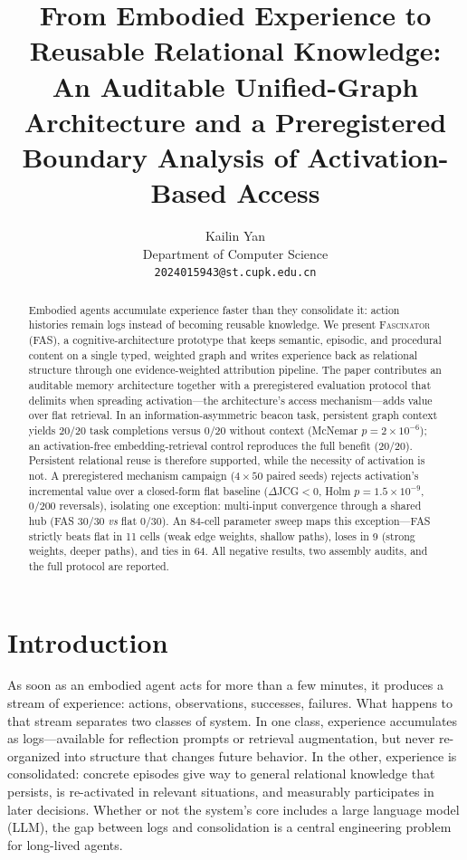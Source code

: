 \documentclass[10pt,a4paper]{article}
\title{\bfseries From Embodied Experience to Reusable Relational Knowledge:\\
An Auditable Unified-Graph Architecture and a Preregistered\\
Boundary Analysis of Activation-Based Access}
\author{Kailin Yan\\ \small Department of Computer Science\\ \small \texttt{2024015943@st.cupk.edu.cn}}
\date{}
\begin{document}
\maketitle

\begin{abstract}
Embodied agents accumulate experience faster than they consolidate it: action histories remain logs instead of becoming reusable knowledge. We present \textsc{Fascinator} (FAS), a cognitive-architecture prototype that keeps semantic, episodic, and procedural content on a single typed, weighted graph and writes experience back as relational structure through one evidence-weighted attribution pipeline. The paper contributes an auditable memory architecture together with a preregistered evaluation protocol that delimits when spreading activation---the architecture's access mechanism---adds value over flat retrieval. In an information-asymmetric beacon task, persistent graph context yields 20/20 task completions versus 0/20 without context (McNemar $p{=}2\times10^{-6}$); an activation-free embedding-retrieval control reproduces the full benefit (20/20). Persistent relational reuse is therefore supported, while the necessity of activation is not. A preregistered mechanism campaign ($4\times50$ paired seeds) rejects activation's incremental value over a closed-form flat baseline ($\Delta$JCG${<}0$, Holm $p{=}1.5\times10^{-9}$, 0/200 reversals), isolating one exception: multi-input convergence through a shared hub (FAS 30/30 \emph{vs} flat 0/30). An 84-cell parameter sweep maps this exception---FAS strictly beats flat in 11 cells (weak edge weights, shallow paths), loses in 9 (strong weights, deeper paths), and ties in 64. All negative results, two assembly audits, and the full protocol are reported.
\end{abstract}

\section{Introduction}
\label{sec:intro}

As soon as an embodied agent acts for more than a few minutes, it produces a stream of experience: actions, observations, successes, failures. What happens to that stream separates two classes of system. In one class, experience accumulates as logs---available for reflection prompts or retrieval augmentation, but never re-organized into structure that changes future behavior. In the other, experience is consolidated: concrete episodes give way to general relational knowledge that persists, is re-activated in relevant situations, and measurably participates in later decisions. Whether or not the system's core includes a large language model (LLM), the gap between logs and consolidation is a central engineering problem for long-lived agents.
\end{document}
